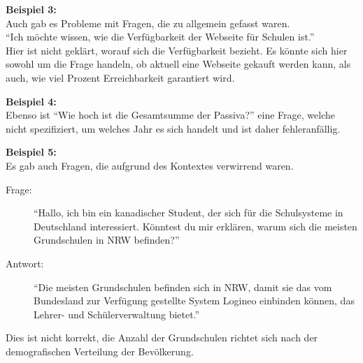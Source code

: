 \textbf{Beispiel 3:}\\
Auch gab es Probleme mit Fragen, die zu allgemein gefasst waren.\\
\enquote{Ich möchte wissen, wie die Verfügbarkeit der Webseite für Schulen ist.}\\
Hier ist nicht geklärt, worauf sich die Verfügbarkeit bezieht. Es könnte sich hier sowohl um die Frage handeln, ob aktuell eine Webseite gekauft werden kann, als auch, wie viel Prozent Erreichbarkeit garantiert wird.

\textbf{Beispiel 4:}\\
Ebenso ist \enquote{Wie hoch ist die Gesamtsumme der Passiva?} eine Frage, welche nicht spezifiziert, um welches Jahr es sich handelt und ist daher fehleranfällig.

\textbf{Beispiel 5:}\\
Es gab auch Fragen, die aufgrund des Kontextes verwirrend waren.\\
\begin{description}
    \item[Frage:] \enquote{Hallo, ich bin ein kanadischer Student, der sich für die Schulsysteme in Deutschland interessiert. Könntest du mir erklären, warum sich die meisten Grundschulen in NRW befinden?}\\
    \item[Antwort:] \enquote{Die meisten Grundschulen befinden sich in NRW, damit sie das vom Bundesland zur Verfügung gestellte System Logineo einbinden können, das Lehrer- und Schülerverwaltung bietet.}
\end{description}
Dies ist nicht korrekt, die Anzahl der Grundschulen richtet sich nach der demografischen Verteilung der Bevölkerung.

